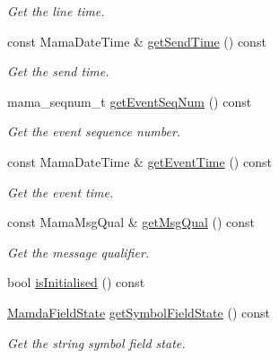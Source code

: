 \begin{CompactItemize}
\begin{CompactList}\small\item\em Get the line time. \item\end{CompactList}\item 
const Mama\-Date\-Time \& \hyperlink{classWombat_1_1MamdaCurrencyListener_dc787103b73d10a395458a270e78d69b}{get\-Send\-Time} () const 
\begin{CompactList}\small\item\em Get the send time. \item\end{CompactList}\item 
mama\_\-seqnum\_\-t \hyperlink{classWombat_1_1MamdaCurrencyListener_4d9a6975f01379ea3f3bfbf11ae1fb13}{get\-Event\-Seq\-Num} () const 
\begin{CompactList}\small\item\em Get the event sequence number. \item\end{CompactList}\item 
const Mama\-Date\-Time \& \hyperlink{classWombat_1_1MamdaCurrencyListener_f50eaef7c50bd1b1e58f0d38967d2b1c}{get\-Event\-Time} () const 
\begin{CompactList}\small\item\em Get the event time. \item\end{CompactList}\item 
const Mama\-Msg\-Qual \& \hyperlink{classWombat_1_1MamdaCurrencyListener_e130dc6327ffac134a0302293c4956e9}{get\-Msg\-Qual} () const 
\begin{CompactList}\small\item\em Get the message qualifier. \item\end{CompactList}\item 
bool \hyperlink{classWombat_1_1MamdaCurrencyListener_33eb7435735c7a88d240714973a1f6a6}{is\-Initialised} () const 
\item 
\hyperlink{namespaceWombat_93aac974f2ab713554fd12a1fa3b7d2a}{Mamda\-Field\-State} \hyperlink{classWombat_1_1MamdaCurrencyListener_80336ebcd54d9fdb027c620335529f1a}{get\-Symbol\-Field\-State} () const 
\begin{CompactList}\small\item\em Get the string symbol field state. \item\end{CompactList}\item 

\end{CompactItemize}
